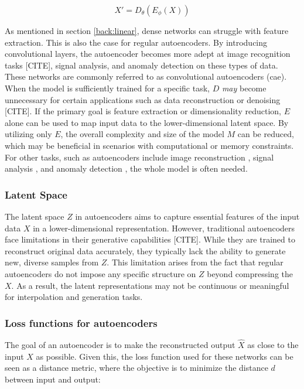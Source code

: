 \begin{equation}
    X' = D_\theta(E_\phi(X))
\end{equation}

As mentioned in section \ref{back:linear}, dense networks can struggle with feature extraction. This is also the case for regular autoencoders. By introducing convolutional layers, the autoencoder becomes more adept at image recognition tasks [CITE], signal analysis, and anomaly detection on these types of data. These networks are commonly referred to as convolutional autoencoders (\acrshort{cae}).  \\

When the model is sufficiently trained for a specific task, $D$ \textit{may} become unnecessary for certain applications such as data reconstruction or denoising [CITE]. If the primary goal is feature extraction or dimensionality reduction, $E$ alone can be used to map input data to the lower-dimensional latent space. By utilizing only $E$, the overall complexity and size of the model $M$ can be reduced, which may be beneficial in scenarios with computational or memory constraints. For other tasks, such as autoencoders include image reconstruction \cite{7797236}, signal analysis \cite{andrysiak2016machine}, and anomaly detection \cite{bank2021autoencoders}, the whole model is often needed. \\
\subsubsection{Latent Space}

The latent space $Z$ in autoencoders aims to capture essential features of the input data $X$ in a lower-dimensional representation. However, traditional autoencoders face limitations in their generative capabilities [CITE]. While they are trained to reconstruct original data accurately, they typically lack the ability to generate new, diverse samples from $Z$.
This limitation arises from the fact that regular autoencoders do not impose any specific structure on $Z$ beyond compressing the $X$. As a result, the latent representations may not be continuous or meaningful for interpolation and generation tasks.



\subsubsection{Loss functions for autoencoders}

The goal of an autoencoder is to make the reconstructed output $\hat{X}$ as close to the input $X$ as possible. Given this, the loss function used for these networks can be seen as a distance metric, where the objective is to minimize the distance $d$ between input and output:

